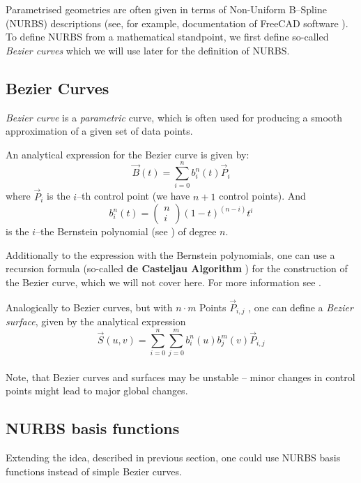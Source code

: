 Parametrised geometries are often given in terms of Non-Uniform B--Spline (NURBS) descriptions (see, for example, documentation of FreeCAD software \cite{FreeCAD}). 
To define NURBS from a mathematical standpoint, we first define so-called \textit{Bezier curves} \cite{farin2002handbook} which we will use later for the definition of NURBS.
\subsection{Bezier Curves}
\emph{Bezier curve} is a \textit{parametric} curve, which is often used for producing a smooth approximation of a given set of data points.
 
An analytical expression for the Bezier curve is given by:
\begin{equation*}
\vec{B}(t)=\sum\limits_{i=0}^n b_i^n(t) \vec{P}_i
\end{equation*}
where $\vec{P}_i$ is the $i$--th control point (we have $n+1$ control points). And
\begin{equation*}
b_i^n(t)=\left(\begin{array}{c}n\\i\end{array}\right)(1-t)^{(n-i)}t^i
\end{equation*}
is the $i$--the Bernstein polynomial (see \cite{lorentz2012bernstein}) of degree $n$.

Additionally to the expression with the Bernstein polynomials, one can use a recursion formula (so-called \textbf{de Casteljau Algorithm} \cite{farin2002handbook}) for the construction of the Bezier curve, which we will not cover here. For more information see \cite{farin2002handbook}.

Analogically to Bezier curves, but with $n\cdot m$ Points $\vec{P}_{i,j}$ ,
one can define a \textit{Bezier surface}, given by the analytical expression
\begin{equation*}
\vec{S}(u,v)=\sum\limits_{i=0}^n \sum\limits_{j=0}^m b_i^n(u) b_j^m(v) \vec{P}_{i,j}
\end{equation*}
\\
Note, that Bezier curves and surfaces may be unstable -- minor changes in control points might lead to major global changes.


\subsection{NURBS basis functions}
Extending the idea, described in previous section, one could use NURBS \cite{farin1999nurbs} basis functions instead of simple Bezier curves. 


